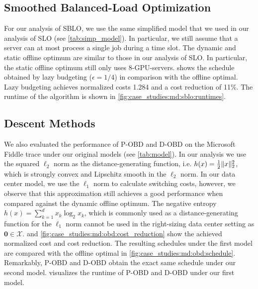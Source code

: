 \subsection{Smoothed Balanced-Load Optimization}

For our analysis of SBLO, we use the same simplified model that we used in our analysis of SLO (see \cref{tab:simp_model}). In particular, we still assume that a server can at most process a single job during a time slot. The dynamic and static offline optimum are similar to those in our analysis of SLO. In particular, the static offline optimum still only uses 8-GPU-servers.  shows the schedule obtained by lazy budgeting ($\epsilon = 1/4$) in comparison with the offline optimal. Lazy budgeting achieves normalized costs 1.284 and a cost reduction of 11\%. The runtime of the algorithm is shown in \cref{fig:case_studies:md:sblo:runtimes}.

\subsection{Descent Methods}

We also evaluated the performance of P-OBD and D-OBD on the Microsoft Fiddle trace under our original models (see \cref{tab:model}). In our analysis we use the squared $\ell_2$ norm as the distance-generating function, i.e. $h(x) = \frac{1}{2} \lVert x\rVert_2^2$, which is strongly convex and Lipschitz smooth in the $\ell_2$ norm. In our data center model, we use the $\ell_1$ norm to calculate switching costs, however, we observe that this approximation still achieves a good performance when compared against the dynamic offline optimum. The negative entropy $h(x) = \sum_{k=1}^d x_k \log_2 x_k$, which is commonly used as a distance-generating function for the $\ell_1$ norm cannot be used in the right-sizing data center setting as $\mathbf{0} \in \mathcal{X}$.  and \cref{fig:case_studies:md:obd:cost_reduction} show the achieved normalized cost and cost reduction. The resulting schedules under the first model are compared with the offline optimal in \cref{fig:case_studies:md:obd:schedule}. Remarkably, P-OBD and D-OBD obtain the exact same schedule under our second model.  visualizes the runtime of P-OBD and D-OBD under our first model.

